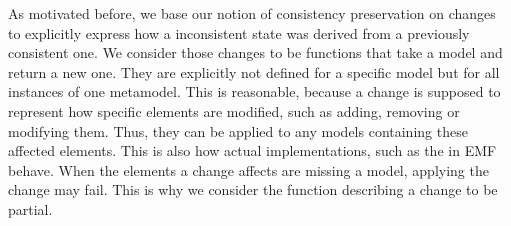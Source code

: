 As motivated before, we base our notion of consistency preservation on changes to explicitly express how a inconsistent state was derived from a previously consistent one.
We consider those changes to be functions that take a model and return a new one.
They are explicitly not defined for a specific model but for all instances of one metamodel.
This is reasonable, because a change is supposed to represent how specific elements are modified, such as adding, removing or modifying them.
Thus, they can be applied to any models containing these affected elements.
This is also how actual implementations, such as the in \gls{EMF} behave.
When the elements a change affects are missing a model, applying the change may fail.
This is why we consider the function describing a change to be partial.
